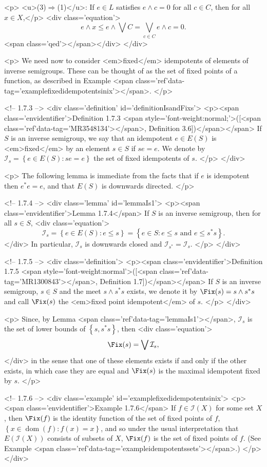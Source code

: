 	<p>
	<u>(3)$\Rightarrow$(1)</u>: If $e\in L$ satisfies $e\land c=0$ for all $c\in C$, then for all $x\in X$,</p>
	<div class='equation'>\[
	e\land x\leq e\land\bigvee C=\bigvee_{c\in C} e\land c=0.
	\]<span class='qed'></span></div>
</div>

<p>
We need now to consider <em>fixed</em> idempotents of elements of inverse semigroups. These can be thought of as the set of fixed points of a function, as described in Example <span class='ref'data-tag='examplefixedidempotentsinix'></span>.
</p>

<!-- 1.7.3 -->
<div class='definition' id='definitionIsandFixs'>
	<p><span class='envidentifier'>Definition 1.7.3
	<span style='font-weight:normal;'>([<span class='ref'data-tag='MR3548134'></span>, Definition 3.6])</span></span>
	If $S$ is an inverse semigroup, we say that an idempotent $e\in E(S)$ is <em>fixed</em> by an element $s\in S$ if $se=e$. We denote by $\mathcal{I}_s=\left\{e\in E(S):se=e\right\}$ the set of fixed idempotents of $s$.
	</p>
</div>

<p>
The following lemma is immediate from the facts that if $e$ is idempotent then $e^*e=e$, and that $E(S)$ is downwards directed.
</p>

<!-- 1.7.4 -->
<div class='lemma' id='lemmaIs1'>
	<p><span class='envidentifier'>Lemma 1.7.4</span>
	If $S$ is an inverse semigroup, then for all $s\in S$,
	<div class='equation'>\[
	\mathcal{I}_s=\left\{e\in E(S):e\leq s\right\}=\left\{e\in S:e\leq s\text{ and }e\leq s^*s\right\}.
	\]</div>
	In particular, $\mathcal{I}_s$ is downwards closed and $\mathcal{I}_{s^*}=\mathcal{I}_s$.
	</p>
</div>

<!-- 1.7.5 -->
<div class='definition'>
	<p><span class='envidentifier'>Definition 1.7.5
	<span style='font-weight:normal'>([<span class='ref'data-tag='MR1300843'></span>, Definition 1.7])</span></span>
	If $S$ is an inverse semigroup, $s\in S$ and the meet $s\land s^*s$ exists, we denote it by $\Fix(s)=s\land s^*s$ and call $\Fix(s)$ the <em>fixed point idempotent</em> of $s$.
	</p>
</div>

<p>
Since, by Lemma <span class='ref'data-tag='lemmaIs1'></span>, $\mathcal{I}_s$ is the set of lower bounds of $\left\{s,s^*s\right\}$, then
<div class='equation'>\[
\Fix(s)=\bigvee\mathcal{I}_s,
\]</div>
in the sense that one of these elements exists if and only if the other exists, in which case they are equal and $\Fix(s)$ is the maximal idempotent fixed by $s$.
</p>

<!-- 1.7.6 -->
<div class='example' id='examplefixedidempotentsinix'>
	<p><span class='envidentifier'>Example 1.7.6</span>
	If $f\in\mathcal{I}(X)$ for some set $X$, then $\Fix(f)$ is the identity function of the set of fixed points of $f$, $\left\{x\in\operatorname{dom}(f):f(x)=x\right\}$, and so under the usual interpretation that $E(\mathcal{I}(X))$ consists of subsets of $X$, $\Fix(f)$ is the set of fixed points of $f$. (See Example <span class='ref'data-tag='exampleidempotentssets'></span>.)
	</p>
</div>


